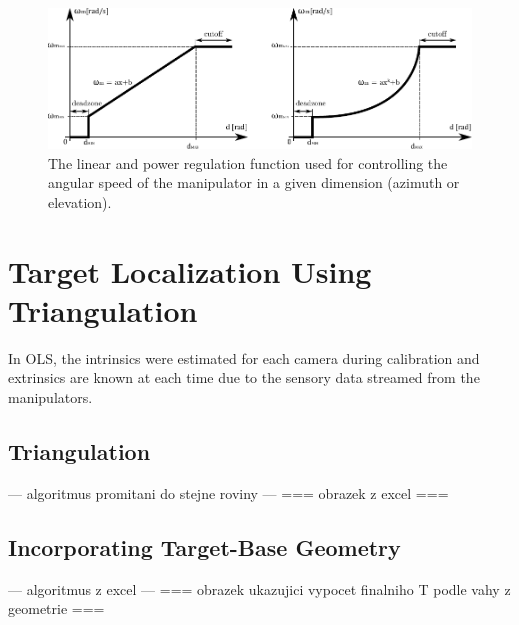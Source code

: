 \begin{figure}[htb]
	\centering
	\includegraphics[width=0.75\linewidth]{fig/regulation_linear_power.pdf}
	\caption{The linear and power regulation function used for controlling the angular speed of the manipulator in a given dimension (azimuth or elevation).}
	\label{fig:regulation_lin_power}
\end{figure}

\section{Target Localization Using Triangulation} \label{txt:localization}

In OLS, the intrinsics were estimated for each camera during calibration and extrinsics are known at each time due to the sensory data streamed from the manipulators.

\subsection{Triangulation}

--- algoritmus promitani do stejne roviny ---
=== obrazek z excel ===

\subsection{Incorporating Target-Base Geometry}

--- algoritmus z excel ---
=== obrazek ukazujici vypocet finalniho T podle vahy z geometrie ===


